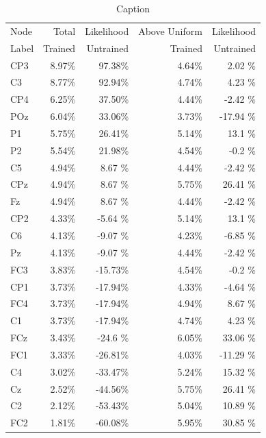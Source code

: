 \begin{table}[H]
    \centering
    \begin{tabular}{| l | r r || r r |}
    \hline
     Node & Total & Likelihood & Above Uniform & Likelihood\\
     Label &  Trained &  Untrained & Trained  & Untrained\\        
     \hline
      CP3   & 8.97\% &  97.38\% &4.64\% &   2.02 \% \\
      C3    & 8.77\% &  92.94\% &4.74\% &   4.23 \% \\
      CP4   & 6.25\% &  37.50\% &4.44\% &  -2.42 \% \\
      POz   & 6.04\% &  33.06\% &3.73\% & -17.94 \% \\
      P1    & 5.75\% &  26.41\% &5.14\% &  13.1  \% \\
      P2    & 5.54\% &  21.98\% &4.54\% &  -0.2  \% \\
      C5    & 4.94\% &  8.67 \% &4.44\% &  -2.42 \% \\
      CPz   & 4.94\% &  8.67 \% &5.75\% &  26.41 \% \\
      Fz    & 4.94\% &  8.67 \% &4.44\% &  -2.42 \% \\
      CP2   & 4.33\% & -5.64 \% &5.14\% &  13.1  \% \\
      C6    & 4.13\% & -9.07 \% &4.23\% &  -6.85 \% \\
      Pz    & 4.13\% & -9.07 \% &4.44\% &  -2.42 \% \\
      FC3   & 3.83\% & -15.73\% &4.54\% &  -0.2  \% \\
      CP1   & 3.73\% & -17.94\% &4.33\% &  -4.64 \% \\
      FC4   & 3.73\% & -17.94\% &4.94\% &   8.67 \% \\
      C1    & 3.73\% & -17.94\% &4.74\% &   4.23 \% \\
      FCz   & 3.43\% & -24.6 \% &6.05\% &  33.06 \% \\
      FC1   & 3.33\% & -26.81\% &4.03\% & -11.29 \% \\
      C4    & 3.02\% & -33.47\% &5.24\% &  15.32 \% \\
      Cz    & 2.52\% & -44.56\% &5.75\% &  26.41 \% \\
      C2    & 2.12\% & -53.43\% &5.04\% &  10.89 \% \\
     FC2    & 1.81\% & -60.08\% &5.95\% &  30.85 \% \\     
    \hline
    \end{tabular}
    \caption{Caption}
    \label{tab:my_label}
\end{table}

